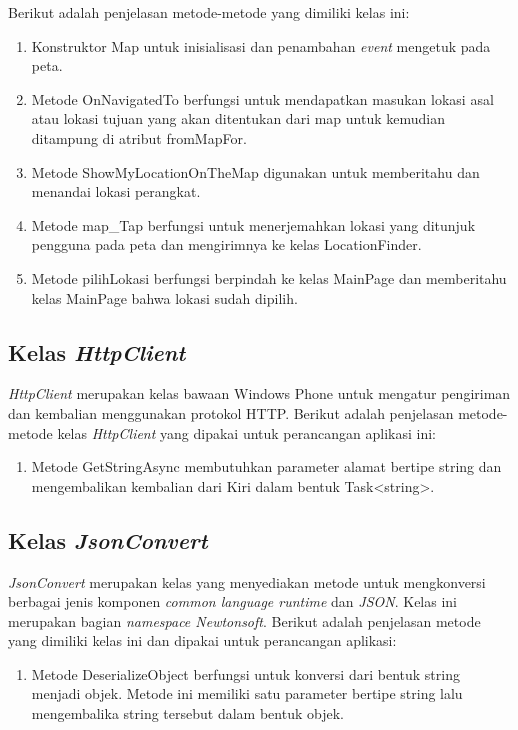 Berikut adalah penjelasan metode-metode yang dimiliki kelas ini:
\begin{enumerate}
	\item Konstruktor Map untuk inisialisasi dan penambahan \textit{event} mengetuk pada peta.
	\item Metode OnNavigatedTo berfungsi untuk mendapatkan masukan lokasi asal atau lokasi tujuan yang akan ditentukan dari map untuk kemudian ditampung di atribut fromMapFor.
	\item Metode ShowMyLocationOnTheMap digunakan untuk memberitahu dan menandai lokasi perangkat.
	\item Metode map\_Tap berfungsi untuk menerjemahkan lokasi yang ditunjuk pengguna pada peta dan mengirimnya ke kelas LocationFinder.
	\item Metode pilihLokasi berfungsi berpindah ke kelas MainPage dan memberitahu kelas MainPage bahwa lokasi sudah dipilih.
\end{enumerate}

\subsection{Kelas \textit{HttpClient}}
\label{lab:Kelas HttpClient}
\hspace{0.5cm} \textit{HttpClient} merupakan kelas bawaan Windows Phone untuk mengatur pengiriman dan kembalian menggunakan protokol HTTP. Berikut adalah penjelasan metode-metode kelas \textit{HttpClient} yang dipakai untuk perancangan aplikasi ini:
\begin{enumerate}
	\item Metode GetStringAsync membutuhkan parameter alamat bertipe string dan mengembalikan kembalian dari Kiri dalam bentuk Task<string>.
\end{enumerate}

\subsection{Kelas \textit{JsonConvert}}
\label{lab:Kelas JsonConvert}
\hspace{0.5cm} \textit{JsonConvert} merupakan kelas yang menyediakan metode untuk mengkonversi berbagai jenis komponen \textit{common language runtime} dan \textit{JSON}. Kelas ini merupakan bagian \textit{namespace Newtonsoft}.  Berikut adalah penjelasan metode yang dimiliki kelas ini dan dipakai untuk perancangan aplikasi:
\begin{enumerate}
	\item Metode DeserializeObject berfungsi untuk konversi dari bentuk string menjadi objek. Metode ini memiliki satu parameter bertipe string lalu mengembalika string tersebut dalam bentuk objek.
\end{enumerate}

